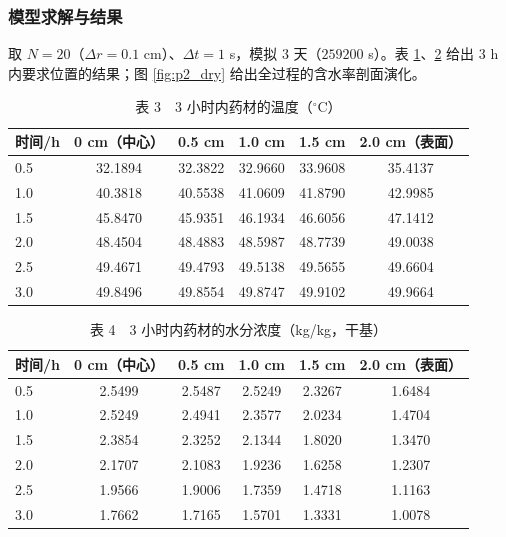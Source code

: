 \subsubsection{模型求解与结果}

取 $N=20$（$\Delta r=0.1$ cm）、$\Delta t=1$ s，模拟 $3$ 天（$259200$ s）。表 \ref{tab:p2_T}、\ref{tab:p2_C} 给出 $3$ h 内要求位置的结果；图 \ref{fig:p2_dry} 给出全过程的含水率剖面演化。

\begin{table}[H]
  \centering
  \caption{表 3　3 小时内药材的温度（$^\circ$C）}
  \label{tab:p2_T}
  \begin{tabular}{lccccc}
    \toprule
    时间/h & 0 cm（中心） & 0.5 cm & 1.0 cm & 1.5 cm & 2.0 cm（表面） \\
    \midrule
    0.5 & 32.1894 & 32.3822 & 32.9660 & 33.9608 & 35.4137 \\
    1.0 & 40.3818 & 40.5538 & 41.0609 & 41.8790 & 42.9985 \\
    1.5 & 45.8470 & 45.9351 & 46.1934 & 46.6056 & 47.1412 \\
    2.0 & 48.4504 & 48.4883 & 48.5987 & 48.7739 & 49.0038 \\
    2.5 & 49.4671 & 49.4793 & 49.5138 & 49.5655 & 49.6604 \\
    3.0 & 49.8496 & 49.8554 & 49.8747 & 49.9102 & 49.9664 \\
    \bottomrule
  \end{tabular}
\end{table}

\begin{table}[H]
  \centering
  \caption{表 4　3 小时内药材的水分浓度（kg/kg，干基）}
  \label{tab:p2_C}
  \begin{tabular}{lccccc}
    \toprule
    时间/h & 0 cm（中心） & 0.5 cm & 1.0 cm & 1.5 cm & 2.0 cm（表面） \\
    \midrule
    0.5 & 2.5499 & 2.5487 & 2.5249 & 2.3267 & 1.6484 \\
    1.0 & 2.5249 & 2.4941 & 2.3577 & 2.0234 & 1.4704 \\
    1.5 & 2.3854 & 2.3252 & 2.1344 & 1.8020 & 1.3470 \\
    2.0 & 2.1707 & 2.1083 & 1.9236 & 1.6258 & 1.2307 \\
    2.5 & 1.9566 & 1.9006 & 1.7359 & 1.4718 & 1.1163 \\
    3.0 & 1.7662 & 1.7165 & 1.5701 & 1.3331 & 1.0078 \\
    \bottomrule
  \end{tabular}
\end{table}

